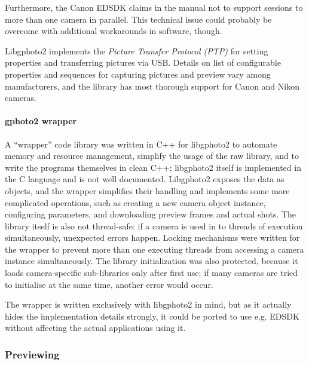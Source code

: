 Furthermore, the Canon EDSDK claims in the manual not to support sessions to more than one camera in parallel. \cite{canonedsdk}
This technical issue could probably be overcome with additional workarounds in software, though.

Libgphoto2 implements the \emph{Picture Transfer Protocol (PTP)} \cite{ptp} for setting properties and transferring pictures via USB.
Details on list of configurable properties and sequences for capturing pictures and preview vary among manufacturers, and the library has most thorough support for Canon and Nikon cameras.

\paragraph{gphoto2 wrapper}
A ``wrapper'' code library was written in C++ for libgphoto2 to automate memory and resource management, simplify the usage of the raw library, and to write the programs themselves in clean C++; libgphoto2 itself is implemented in the C language and is not well documented.
Libgphoto2 exposes the data as objects, and the wrapper simplifies their handling and implements some more complicated operations, such as creating a new camera object instance, configuring parameters, and downloading preview frames and actual shots.
The library itself is also not thread-safe: if a camera is used in to threads of execution simultaneously, unexpected errors happen. \cite{gphoto2}
Locking mechanisms were written for the wrapper to prevent more than one executing threads from accessing a camera instance simultaneously.
The library initialization was also protected, because it loads camera-specific sub-libraries only after first use; if many cameras are tried to initialise at the same time, another error would occur.

The wrapper is written exclusively with libgphoto2 in mind, but as it actually hides the implementation details strongly, it could be ported to use e.g. EDSDK without affecting the actual applications using it.


\subsubsection{Previewing} %


